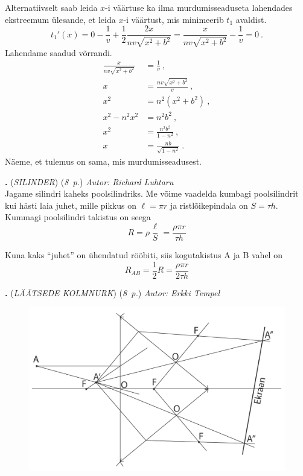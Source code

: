 \documentclass[11pt,a5paper]{article}
\newcommand{\numb}[1]{\vspace{5pt}\textbf{\large #1}}
\newcommand{\nimi}[1]{(\textsl{\small #1})}
\newcommand{\punktid}[1]{(\emph{#1~p.})}
\newcounter{ylesanne}
\newcommand{\yl}[1]{\addtocounter{ylesanne}{1}\numb{\theylesanne.} \nimi{#1} \newblock{}}
\newcommand{\autor}[1]{\emph{Autor: #1}}%
\begin{document}
Alternatiivselt saab leida \(x\)-i väärtuse ka ilma murdumisseaduseta lahendades ekstreemum ülesande, et leida \(x\)-i väärtust, mis minimeerib \(t_1\) avaldist.
\[
    t_1'(x) = 0 - \frac{1}{v} + \frac{1}{2} \frac{2x}{nv\sqrt{x^2 + b^2}} = \frac{x}{nv\sqrt{x^2 + b^2}} - \frac{1}{v} = 0 \ .
\]
Lahendame saadud võrrandi.
\begin{align*}
    \frac{x}{nv\sqrt{x^2 + b^2}} &= \frac{1}{v} \ , \\
    x &= \frac{nv\sqrt{x^2 + b^2}}{v} \ , \\
    x^2 &= n^2 (x^2 + b^2) \ , \\
    x^2 - n^2 x^2 &= n^2 b^2 \ , \\
    x^2 &= \frac{n^2 b^2}{1 - n^2} \ , \\
    x &= \frac{nb}{\sqrt{1 - n^2}} \ .
\end{align*}
Näeme, et tulemus on sama, mis murdumisseadusest.



\yl{SILINDER}
\punktid{8} \autor{Richard Luhtaru}\\
Jagame silindri kaheks poolsilindriks. Me võime vaadelda kumbagi poolsilindrit kui hästi laia juhet, mille pikkus on $\ell = \pi r$ ja ristlõikepindala on $S = \tau h$. Kummagi poolsilindri takistus on seega
\begin{equation*}
    R = \rho \frac{\ell}{S} = \frac{\rho \pi r}{\tau h}
\end{equation*}

Kuna kaks ``juhet'' on ühendatud rööbiti, siis kogutakistus A ja B vahel on
\begin{equation*}
    R_{AB} = \frac{1}{2}R = \frac{\rho \pi r}{2\tau h}
\end{equation*}

\newpage
\yl{LÄÄTSEDE KOLMNURK}
\punktid{8} \autor{Erkki Tempel}\\

\begin{figure}[h]
    \centering
    \includegraphics[scale=0.5]{joonislah.pdf}
\end{figure}
\end{document}
